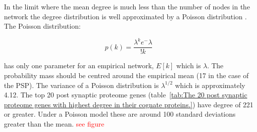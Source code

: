 In the limit where the mean degree is much less than the number of nodes in the network the degree distribution is well approximated by a Poisson distribution \cite{barabasi2016network}. The Poisson distribution:

\begin{equation}
    p(k) = \frac{\lambda^k e ^-\lambda}{!k}
\end{equation}

has only one parameter for an empirical network, $E[k]$ which is $\lambda$.  The probability mass should be centred around the empirical mean  (17 in the case of the PSP). The variance of a Poisson distribution is $\lambda^{1/2}$ which is approximately 4.12. The top 20 post synaptic proteome genes (table~\ref{tab:The 20 post synaptic proteome genes with highest degree in their cognate proteins.}) have degree of 221 or greater. Under a Poisson model these are around 100 standard deviations greater than the mean.   
 \textcolor{red}{see figure}


